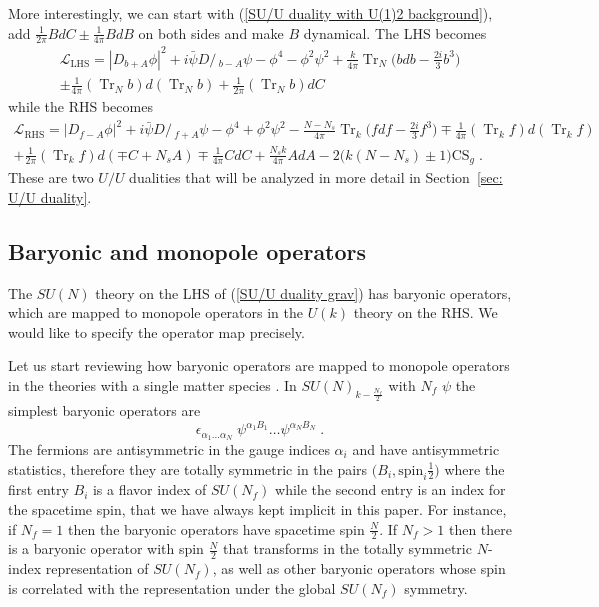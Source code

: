 \documentclass[a4paper, 12pt]{article}
\numberwithin{equation}{section}
\newcommand{\Dslash}{D\!\!\!\!\slash\,}
\newcommand{\be}{\begin{equation}} \newcommand{\ee}{\end{equation}}
\newcommand{\cL}{\mathcal{L}}
\DeclareMathOperator{\Tr}{Tr}
\begin{document}
More interestingly, we can start with (\ref{SU/U duality with U(1)2 background}), add $\frac1{2\pi} BdC \pm \frac1{4\pi} BdB$ on both sides and make $B$ dynamical. The LHS becomes
\begin{multline}
\cL_\text{LHS} = |D_{b+A}\phi|^2 + i \bar\psi \Dslash_{b-A} \psi - \phi^4 - \phi^2\psi^2 + \frac{k}{4\pi} \Tr_N \Big( bdb- \frac{2i}3 b^3 \Big) \\
\pm \frac1{4\pi} (\Tr_N b) d (\Tr_N b) + \frac1{2\pi} (\Tr_N b)dC
\end{multline}
while the RHS becomes
\begin{multline}
\cL_\text{RHS} = |D_{f-A}\phi|^2 + i \bar\psi \Dslash_{f+A} \psi - \phi^4 + \phi^2\psi^2 - \frac{N-N_s}{4\pi} \Tr_k \Big( fdf - \frac{2i}3 f^3 \Big) \mp \frac1{4\pi} (\Tr_k f)d(\Tr_k f) \\
+ \frac1{2\pi} (\Tr_k f)d (\mp C + N_s A) \mp \frac1{4\pi} CdC + \frac{N_s k}{4\pi} AdA - 2 \big( k (N-N_s) \pm 1 \big) \text{CS}_g \;.
\end{multline}
These are two $U/U$ dualities that will be analyzed in more detail in Section~\ref{sec: U/U duality}.
















\subsection{Baryonic and monopole operators}
\label{sec: SU/U monopoles}

The $SU(N)$ theory on the LHS of (\ref{SU/U duality grav}) has baryonic operators, which are mapped to monopole operators in the $U(k)$ theory on the RHS. We would like to specify the operator map precisely.

Let us start reviewing how baryonic operators are mapped to monopole operators in the theories with a single matter species \cite{Radicevic:2015yla, Aharony:2015mjs, Aharony:2016jvv}. In $SU(N)_{k-\frac{N_f}2}$ with $N_f$ $\psi$ the simplest baryonic operators are
\be
\label{baryons SU(N) psi}
\epsilon_{\alpha_1\ldots\alpha_N} \; \psi^{\alpha_1B_1} \ldots \psi^{\alpha_N B_N} \;.
\ee
The fermions are antisymmetric in the gauge indices $\alpha_i$ and have antisymmetric statistics, therefore they are totally symmetric in the pairs $\big( B_i, \text{spin}_i \frac12 \big)$ where the first entry $B_i$ is a flavor index of $SU(N_f)$ while the second entry is an index for the spacetime spin, that we have always kept implicit in this paper. For instance, if $N_f=1$ then the baryonic operators have spacetime spin $\frac N2$. If $N_f>1$ then there is a baryonic operator with spin $\frac N2$ that transforms in the totally symmetric $N$-index representation of $SU(N_f)$, as well as other baryonic operators whose spin is correlated with the representation under the global $SU(N_f)$ symmetry.
\end{document}
